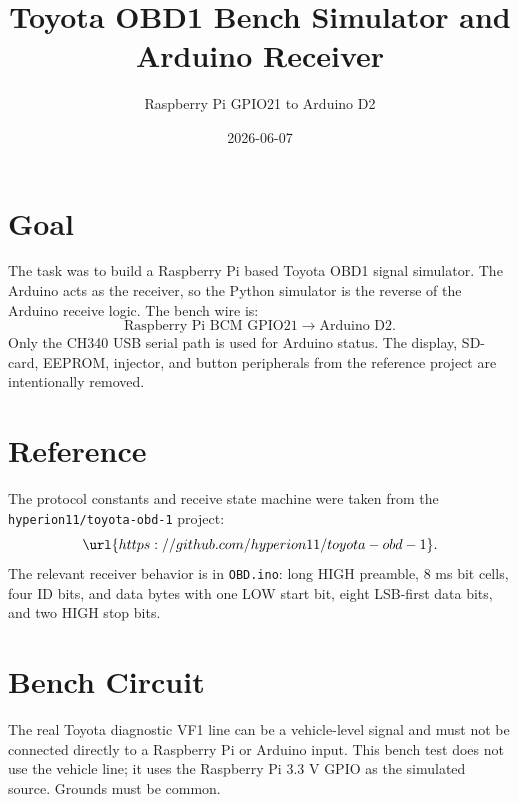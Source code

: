 \documentclass[11pt]{article}
\title{Toyota OBD1 Bench Simulator and Arduino Receiver}
\author{Raspberry Pi GPIO21 to Arduino D2}
\date{2026-06-07}
\begin{document}
\maketitle

\section{Goal}

The task was to build a Raspberry Pi based Toyota OBD1 signal simulator.
The Arduino acts as the receiver, so the Python simulator is the reverse of
the Arduino receive logic.  The bench wire is:
\[
  \text{Raspberry Pi BCM GPIO21} \rightarrow \text{Arduino D2}.
\]
Only the CH340 USB serial path is used for Arduino status.  The display,
SD-card, EEPROM, injector, and button peripherals from the reference project
are intentionally removed.

\section{Reference}

The protocol constants and receive state machine were taken from the
\texttt{hyperion11/toyota-obd-1} project:
\[
  \url{https://github.com/hyperion11/toyota-obd-1}.
\]
The relevant receiver behavior is in \texttt{OBD.ino}: long HIGH preamble,
8 ms bit cells, four ID bits, and data bytes with one LOW start bit, eight
LSB-first data bits, and two HIGH stop bits.

\section{Bench Circuit}

The real Toyota diagnostic VF1 line can be a vehicle-level signal and must
not be connected directly to a Raspberry Pi or Arduino input.  This bench
test does not use the vehicle line; it uses the Raspberry Pi 3.3 V GPIO as
the simulated source.  Grounds must be common.
\end{document}
